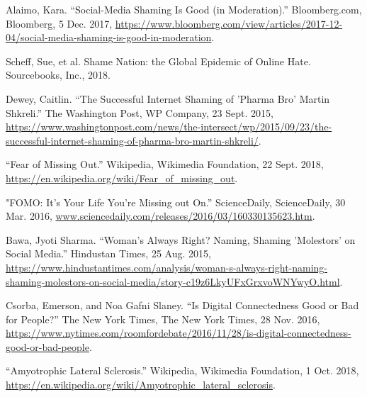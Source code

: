 \documentclass[a4paper, 11pt]{article}
\begin{document}
\begin{thebibliography}{X}
  Alaimo, Kara. “Social-Media Shaming Is Good (in Moderation).” Bloomberg.com, Bloomberg, 5 Dec. 2017, \href{https://www.bloomberg.com/view/articles/2017-12-04/social-media-shaming-is-good-in-moderation}{https://www.bloomberg.com/view/articles/2017-12-04/social-media-shaming-is-good-in-moderation}.

  Scheff, Sue, et al. Shame Nation: the Global Epidemic of Online Hate. Sourcebooks, Inc., 2018.

  Dewey, Caitlin. “The Successful Internet Shaming of 'Pharma Bro' Martin Shkreli.” The Washington Post, WP Company, 23 Sept. 2015, \href{https://www.washingtonpost.com/news/the-intersect/wp/2015/09/23/the-successful-internet-shaming-of-pharma-bro-martin-shkreli/}{https://www.washingtonpost.com/news/the-intersect/wp/2015/09/23/the-successful-internet-shaming-of-pharma-bro-martin-shkreli/}.

  “Fear of Missing Out.” Wikipedia, Wikimedia Foundation, 22 Sept. 2018, \href{https://en.wikipedia.org/wiki/Fear\_of\_missing\_out}{https://en.wikipedia.org/wiki/Fear\_of\_missing\_out}.

  "FOMO: It's Your Life You're Missing out On.” ScienceDaily, ScienceDaily, 30 Mar. 2016, \href{www.sciencedaily.com/releases/2016/03/160330135623.htm}{www.sciencedaily.com/releases/2016/03/160330135623.htm}.

  Bawa, Jyoti Sharma. “Woman's Always Right? Naming, Shaming 'Molestors' on Social Media.” Hindustan Times, 25 Aug. 2015, \href{https://www.hindustantimes.com/analysis/woman-s-always-right-naming-shaming-molestors-on-social-media/story-c19z6LkyUFxGrxvoWNYwyO.html}{https://www.hindustantimes.com/analysis/woman-s-always-right-naming-shaming-molestors-on-social-media/story-c19z6LkyUFxGrxvoWNYwyO.html}.

  Csorba, Emerson, and Noa Gafni Slaney. “Is Digital Connectedness Good or Bad for People?” The New York Times, The New York Times, 28 Nov. 2016, \href{https://www.nytimes.com/roomfordebate/2016/11/28/is-digital-connectedness-good-or-bad-people}{https://www.nytimes.com/roomfordebate/2016/11/28/is-digital-connectedness-good-or-bad-people}.

  “Amyotrophic Lateral Sclerosis.” Wikipedia, Wikimedia Foundation, 1 Oct. 2018, \href{https://en.wikipedia.org/wiki/Amyotrophic\_lateral\_sclerosis}{https://en.wikipedia.org/wiki/Amyotrophic\_lateral\_sclerosis}.


\end{thebibliography}
\end{document}
